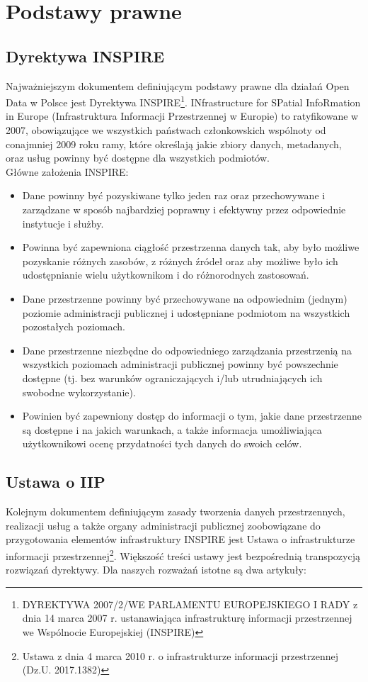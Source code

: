 \chapter{Podstawy prawne}
	\section{Dyrektywa INSPIRE}
Najważniejszym dokumentem definiującym podstawy prawne dla działań Open Data w Polsce jest Dyrektywa INSPIRE\footnote{DYREKTYWA 2007/2/WE PARLAMENTU EUROPEJSKIEGO I RADY z dnia 14 marca 2007 r. ustanawiająca infrastrukturę informacji przestrzennej we Wspólnocie Europejskiej (INSPIRE)}. INfrastructure for SPatial InfoRmation in Europe (Infrastruktura Informacji Przestrzennej w Europie) to ratyfikowane w 2007, obowiązujące we wszystkich państwach członkowskich wspólnoty od conajmniej 2009 roku ramy, które określają jakie zbiory danych, metadanych, oraz usług powinny być dostępne dla wszystkich podmiotów. 
\\Główne założenia INSPIRE:
\begin{itemize}
\item Dane powinny być pozyskiwane tylko jeden raz oraz przechowywane i zarządzane w sposób najbardziej poprawny i efektywny przez odpowiednie instytucje i służby.
\item Powinna być zapewniona ciągłość przestrzenna danych tak, aby było możliwe pozyskanie różnych zasobów, z różnych źródeł oraz aby możliwe było ich udostępnianie wielu użytkownikom i do różnorodnych zastosowań.
\item Dane przestrzenne powinny być przechowywane na odpowiednim (jednym) poziomie administracji publicznej i udostępniane podmiotom na wszystkich pozostałych poziomach.
\item Dane przestrzenne niezbędne do odpowiedniego zarządzania przestrzenią na wszystkich poziomach administracji publicznej powinny być powszechnie dostępne (tj. bez warunków ograniczających i/lub utrudniających ich swobodne wykorzystanie).
\item Powinien być zapewniony dostęp do informacji o tym, jakie dane przestrzenne są dostępne i na jakich
warunkach, a także informacja umożliwiająca użytkownikowi ocenę przydatności tych danych do swoich celów.
\end{itemize}

\section{Ustawa o IIP}
Kolejnym dokumentem definiującym zasady tworzenia danych przestrzennych, realizacji usług a także organy administracji publicznej zoobowiązane do przygotowania elementów infrastruktury INSPIRE jest Ustawa o infrastrukturze informacji przestrzennej\footnote{Ustawa z dnia 4 marca 2010 r. o infrastrukturze informacji przestrzennej (Dz.U. 2017.1382)}. Większość treści ustawy jest bezpośrednią transpozycją rozwiązań dyrektywy. Dla naszych rozważań istotne są dwa artykuły:

